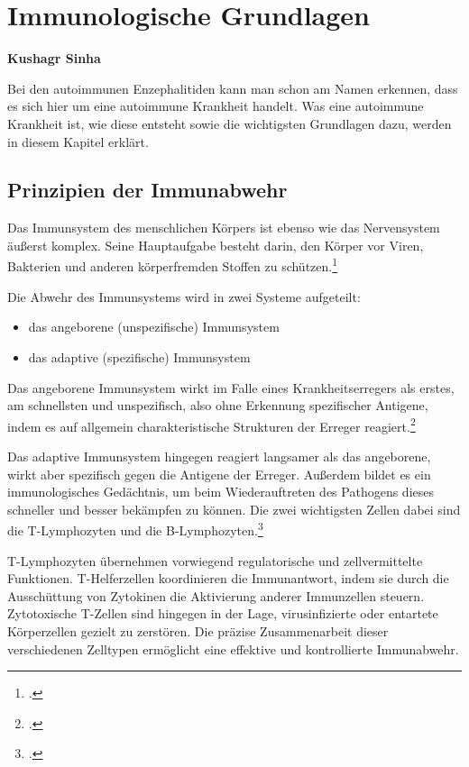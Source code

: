 \section{Immunologische Grundlagen}
\textbf{Kushagr Sinha}

Bei den autoimmunen Enzephalitiden kann man schon am Namen erkennen, dass es sich hier um eine autoimmune Krankheit handelt. Was eine autoimmune Krankheit ist, wie diese entsteht sowie die wichtigsten Grundlagen dazu, werden in diesem Kapitel erklärt.

\subsection{Prinzipien der Immunabwehr}

Das Immunsystem des menschlichen Körpers ist ebenso wie das Nervensystem äußerst komplex. Seine Hauptaufgabe besteht darin, den Körper vor Viren, Bakterien und anderen körperfremden Stoffen zu schützen.\footcite{Smith1999}

Die Abwehr des Immunsystems wird in zwei Systeme aufgeteilt:
\begin{itemize}
	\item das angeborene (unspezifische) Immunsystem
	\item das adaptive (spezifische) Immunsystem
\end{itemize}

Das angeborene Immunsystem wirkt im Falle eines Krankheitserregers als erstes, am schnellsten und unspezifisch, also ohne Erkennung spezifischer Antigene, indem es auf allgemein charakteristische Strukturen der Erreger reagiert.\footcite{MSDImmunsystem2026}

Das adaptive Immunsystem hingegen reagiert langsamer als das angeborene, wirkt aber spezifisch gegen die Antigene der Erreger. Außerdem bildet es ein immunologisches Gedächtnis, um beim Wiederauftreten des Pathogens dieses schneller und besser bekämpfen zu können. Die zwei wichtigsten Zellen dabei sind die T-Lymphozyten und die B-Lymphozyten.\footcite{MSDImmunsystem2026}

T-Lymphozyten übernehmen vorwiegend regulatorische und zellvermittelte Funktionen. T-Helferzellen koordinieren die Immunantwort, indem sie durch die Ausschüttung von Zytokinen die Aktivierung anderer Immunzellen steuern. Zytotoxische T-Zellen sind hingegen in der Lage, virusinfizierte oder entartete Körperzellen gezielt zu zerstören. Die präzise Zusammenarbeit dieser verschiedenen Zelltypen ermöglicht eine effektive und kontrollierte Immunabwehr.

